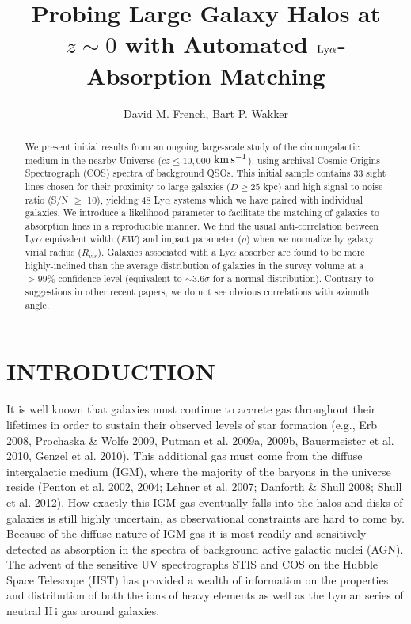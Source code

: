 \documentclass[twocolumn,tighten]{aastex6}
\begin{document}
\title{Probing Large Galaxy Halos at $z\sim0$ with Automated $\rm L \MakeLowercase{y} \alpha$-Absorption Matching}

\author{David M. French, Bart P. Wakker}


\begin{abstract}

We present initial results from an ongoing large-scale study of the circumgalactic medium in the nearby Universe ($cz \leq 10,000$ $\rm km\, s^{-1}$), using archival Cosmic Origins Spectrograph (COS) spectra of background QSOs. This initial sample contains 33 sight lines chosen for their proximity to large galaxies ($D\geq25$ kpc) and high signal-to-noise ratio (S/N $\geq$ 10), yielding 48 Ly$\alpha$ systems which we have paired with individual galaxies. We introduce a likelihood parameter to facilitate the matching of galaxies to absorption lines in a reproducible manner. We find the usual anti-correlation between Ly$\alpha$ equivalent width ($EW$) and impact parameter ($\rho$) when we normalize by galaxy virial radius ($R_{vir}$). Galaxies associated with a Ly$\alpha$ absorber are found to be more highly-inclined than the average distribution of galaxies in the survey volume at a $>99\%$ confidence level (equivalent to $\sim 3.6 \sigma$ for a normal distribution). Contrary to suggestions in other recent papers, we do not see obvious correlations with azimuth angle.

\end{abstract}




\section{INTRODUCTION}

It is well known that galaxies must continue to accrete gas throughout their lifetimes in order to sustain their observed levels of star formation (e.g., Erb 2008, Prochaska $\&$ Wolfe 2009, Putman et al. 2009a, 2009b, Bauermeister et al. 2010, Genzel et al. 2010). This additional gas must come from the diffuse intergalactic medium (IGM), where the majority of the baryons in the universe reside (Penton et al. 2002, 2004; Lehner et al. 2007; Danforth $\&$ Shull 2008; Shull et al. 2012). How exactly this IGM gas eventually falls into the halos and disks of galaxies is still highly uncertain, as observational constraints are hard to come by. Because of the diffuse nature of IGM gas it is most readily and sensitively detected as absorption in the spectra of background active galactic nuclei (AGN). The advent of the sensitive UV spectrographs STIS and COS on the Hubble Space Telescope (HST) has provided a wealth of information on the properties and distribution of both the ions of heavy elements as well as the Lyman series of neutral H\,{\sc i} gas around galaxies. 
\end{document}
